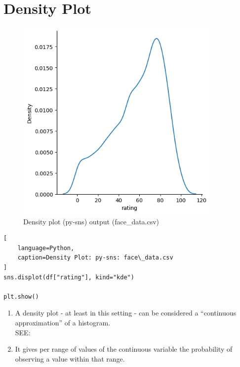 \section{Density Plot \cite{data/online/seaborn.displot}} \label{Visualizing Data/Density Plot}

\begin{table}[H]
\begin{minipage}[t]{0.35\linewidth}
\begin{figure}[H]
    \centering
    \includegraphics[width=0.9\linewidth, height=10cm, keepaspectratio]{images/data/__visualizations__/sns-density-kde-rating-face-data.png}
    \caption{Density plot (py-sns) output (face\_data.csv)}
\end{figure}
\end{minipage}
\hspace{0.2cm}
\vrule width 1pt
\hspace{0.5cm}
\begin{minipage}[t]{0.57\linewidth}
\begin{lstlisting}[
    language=Python,
    caption=Density Plot: py-sns: face\_data.csv
]
sns.displot(df["rating"], kind="kde")

plt.show()
\end{lstlisting}

\vspace{0.2cm}

\begin{enumerate}
    \item A density plot - at least in this setting - can be considered a “continuous approximation” of a histogram. \hfill \cite{statistics/book/Statistics-for-Data-Scientists/Maurits-Kaptein} \\
    SEE: 

    \item It gives per range of values of the continuous variable the probability of observing a value within that range. \hfill \cite{statistics/book/Statistics-for-Data-Scientists/Maurits-Kaptein}


\end{enumerate}

\end{minipage}
\end{table}





